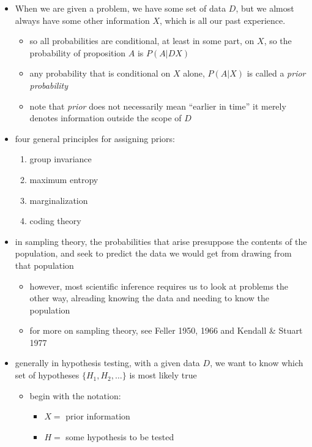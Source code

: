 \documentclass[../jaynes_prob_theory_notes.tex]{subfiles}
\begin{document}
\begin{itemize}
    \item When we are given a problem, we have some set of data $D$, but we almost always have some other information $X$, which is all our past experience.
        \begin{itemize}
            \item so all probabilities are conditional, at least in some part, on $X$, so the probability of proposition $A$ is $P(A|DX)$
            \item any probability that is conditional on $X$ alone, $P(A|X)$ is called a \textit{prior probability}
            \item note that \textit{prior} does not necessarily mean ``earlier in time'' it merely denotes information outside the scope of $D$
        \end{itemize}
    \item four general principles for assigning priors:
        \begin{enumerate}
            \item group invariance
            \item maximum entropy
            \item marginalization
            \item coding theory
        \end{enumerate}
    \item in sampling theory, the probabilities that arise presuppose the contents of the population, and seek to predict the data we would get from drawing from that population
        \begin{itemize}
            \item however, most scientific inference requires us to look at problems the other way, alreading knowing the data and needing to know the population
            \item for more on sampling theory, see Feller 1950, 1966 and Kendall \& Stuart 1977
        \end{itemize}
    \item generally in hypothesis testing, with a given data $D$, we want to know which set of hypotheses $\{H_1, H_2,\ldots\}$ is most likely true
        \begin{itemize}
            \item begin with the notation:
                \begin{itemize}
                    \item[] $X =$ prior information
                    \item[] $H =$ some hypothesis to be tested

\end{itemize}
\end{itemize}
\end{itemize}
\end{document}
